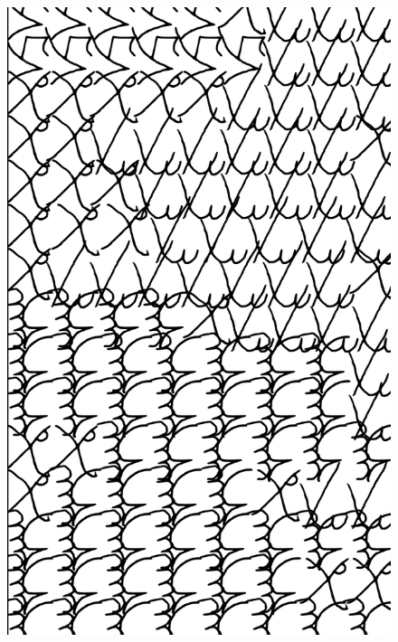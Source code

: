 \makeatletter\@openrightfalse
\movetooddpage
\begin{absolutelynopagebreak}
\begin{vplace}
\begin{figure}[H]
\begin{adjustwidth}{-0.99cm}{}
  \centering
  \vspace*{-1.97cm}
  \hspace*{-0.65cm}
  \includegraphics[width=115mm]{./imgs/img10.pdf}  
  \hfill
\end{adjustwidth}

\thispagestyle{empty}

\end{figure}
\end{vplace}

\end{absolutelynopagebreak}

